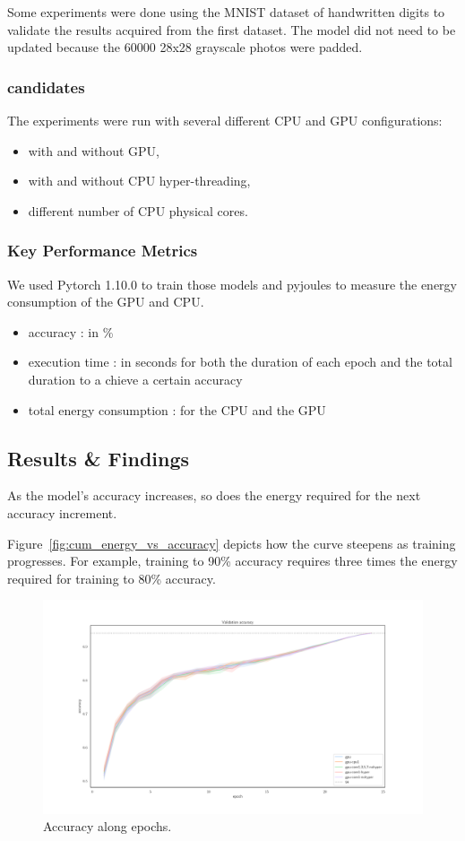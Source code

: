 Some experiments were done using the MNIST dataset of handwritten digits to validate the results acquired from the first dataset.
The model did not need to be updated because the 60000 28x28 grayscale photos were padded.


\subsubsection{candidates}
The experiments were run with several different CPU and GPU configurations:
\begin{itemize}
    \item with and without GPU,
    \item with and without CPU hyper-threading,
    \item different number of CPU physical cores.
\end{itemize}

\subsubsection{Key Performance Metrics}
We used Pytorch 1.10.0 to train those models and pyjoules to measure the energy consumption of the GPU and CPU.
\begin{itemize}
    \item accuracy : in \%
    \item execution time : in seconds for both the duration of each epoch and the total duration to a chieve a certain accuracy
    \item total energy consumption : for the CPU and the  GPU
\end{itemize}


\subsection{Results \& Findings}
As the model's accuracy increases, so does the energy required for the next accuracy increment.

Figure~\ref{fig:cum_energy_vs_accuracy} depicts how the curve steepens as training progresses.
For example, training to 90\% accuracy requires three times the energy required for training to 80\% accuracy.

\begin{figure}
    \centering
    \includegraphics[width=\linewidth]{imgs/accuracy_basedonepoch}
    \caption{Accuracy along epochs.}
    \label{fig:p2}
\end{figure}

